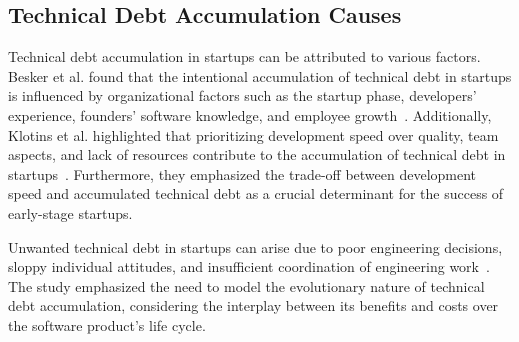 
\subsection{Technical Debt Accumulation Causes}
Technical debt accumulation in startups can be attributed to various factors. Besker et al. found that the intentional accumulation of technical debt in startups is influenced by organizational factors such as the startup phase, developers' experience, founders' software knowledge, and employee growth~\cite{Besker2018}. Additionally, Klotins et al. highlighted that prioritizing development speed over quality, team aspects, and lack of resources contribute to the accumulation of technical debt in startups~\cite{Klotins:2018:ETD}. Furthermore, they emphasized the trade-off between development speed and accumulated technical debt as a crucial determinant for the success of early-stage startups.

Unwanted technical debt in startups can arise due to poor engineering decisions, sloppy individual attitudes, and insufficient coordination of engineering work~\cite{Klotins882019}. The study emphasized the need to model the evolutionary nature of technical debt accumulation, considering the interplay between its benefits and costs over the software product's life cycle.

